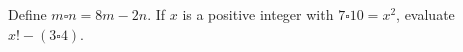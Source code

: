 Define $m\square n=8m-2n$. If $x$ is a positive integer with $7\square10=x^2$, evaluate $x!-(3\square4)$.
